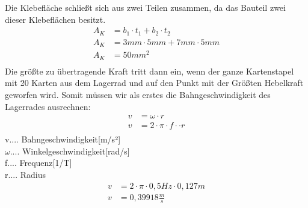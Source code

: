 Die Klebefläche schließt sich aus zwei Teilen zusammen, da das Bauteil zwei dieser Klebeflächen besitzt.
\begin{align*}
A_{K} &= b_{1}\cdot t_{1}+b_{2}\cdot t_{2}\\
A_{K} &=3 mm\cdot 5 mm+7 mm\cdot 5 mm\\
A_{K} &= 50 mm^{2}\\
\end{align*}
Die größte zu übertragende Kraft tritt dann ein, wenn der ganze Kartenstapel mit 20 Karten aus dem
Lagerrad und auf den Punkt mit der Größten Hebelkraft geworfen wird.
Somit müssen wir als erstes die Bahngeschwindigkeit des Lagerrades ausrechnen:
\begin{align*}
v &= \omega \cdot r\\
v &= 2 \cdot \pi \cdot f \cdot \cdot r\\
\end{align*}
v.... Bahngeschwindigkeit[m/s²]\\
$\omega$.... Winkelgeschwindigkeit[rad/s]\\
f.... Frequenz[1/T]\\
r.... Radius\\
\begin{align*}
v &= 2 \cdot \pi \cdot 0,5 Hz \cdot 0,127 m\\
v &= 0,39918 \tfrac{m}{s}\\
\end{align*}

